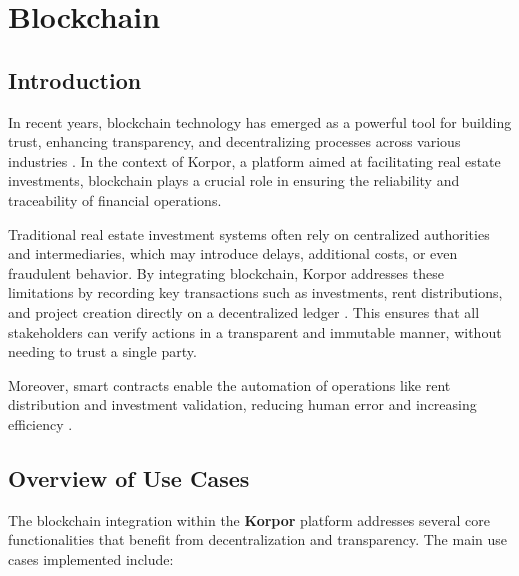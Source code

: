 \chapter{Blockchain}

\section*{Introduction}

In recent years, blockchain technology has emerged as a powerful tool for building trust, enhancing transparency, and decentralizing processes across various industries \cite{Nakamoto2008Bitcoin, Tapscott2016Blockchain}. In the context of Korpor, a platform aimed at facilitating real estate investments, blockchain plays a crucial role in ensuring the reliability and traceability of financial operations.

Traditional real estate investment systems often rely on centralized authorities and intermediaries, which may introduce delays, additional costs, or even fraudulent behavior. By integrating blockchain, Korpor addresses these limitations by recording key transactions such as investments, rent distributions, and project creation directly on a decentralized ledger \cite{Veuger2018RealEstateBlockchain}. This ensures that all stakeholders can verify actions in a transparent and immutable manner, without needing to trust a single party.

Moreover, smart contracts enable the automation of operations like rent distribution and investment validation, reducing human error and increasing efficiency \cite{Buterin2014Ethereum, Szabo1997SmartContracts}.

\section{Overview of Use Cases}

The blockchain integration within the \textbf{\textcolor{primary}{Korpor}} platform addresses several core functionalities that benefit from decentralization and transparency. The main use cases implemented include:

